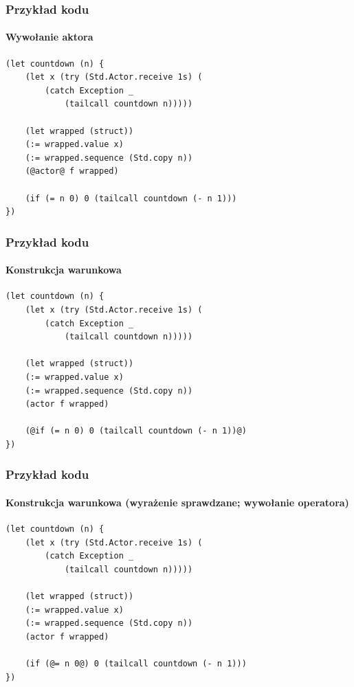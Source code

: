 \documentclass{beamer}
\begin{document}
\begin{frame}[fragile]
    \frametitle{Przykład kodu}
    \framesubtitle{Wywołanie aktora}

    \begin{small}
    \begin{lstlisting}
(let countdown (n) {
    (let x (try (Std.Actor.receive 1s) (
        (catch Exception _
            (tailcall countdown n)))))

    (let wrapped (struct))
    (:= wrapped.value x)
    (:= wrapped.sequence (Std.copy n))
    (@actor@ f wrapped)

    (if (= n 0) 0 (tailcall countdown (- n 1)))
})
    \end{lstlisting}
    \end{small}
\end{frame}

\begin{frame}[fragile]
    \frametitle{Przykład kodu}
    \framesubtitle{Konstrukcja warunkowa}

    \begin{small}
    \begin{lstlisting}
(let countdown (n) {
    (let x (try (Std.Actor.receive 1s) (
        (catch Exception _
            (tailcall countdown n)))))

    (let wrapped (struct))
    (:= wrapped.value x)
    (:= wrapped.sequence (Std.copy n))
    (actor f wrapped)

    (@if (= n 0) 0 (tailcall countdown (- n 1))@)
})
    \end{lstlisting}
    \end{small}
\end{frame}

\begin{frame}[fragile]
    \frametitle{Przykład kodu}
    \framesubtitle{Konstrukcja warunkowa (wyrażenie sprawdzane; wywołanie operatora)}

    \begin{small}
    \begin{lstlisting}
(let countdown (n) {
    (let x (try (Std.Actor.receive 1s) (
        (catch Exception _
            (tailcall countdown n)))))

    (let wrapped (struct))
    (:= wrapped.value x)
    (:= wrapped.sequence (Std.copy n))
    (actor f wrapped)

    (if (@= n 0@) 0 (tailcall countdown (- n 1)))
})
    \end{lstlisting}
    \end{small}
\end{frame}
\end{document}
